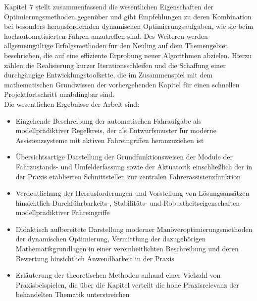Kapitel~7 stellt zusammenfassend die wesentlichen Eigenschaften der Optimierungsmethoden gegenüber und gibt Empfehlungen zu deren Kombination bei besonders herausfordernden dynamischen Optimierungsaufgaben, wie sie beim hochautomatisierten Fahren anzutreffen sind. Des Weiteren werden allgemeingültige Erfolgsmethoden für den Neuling auf dem Themengebiet beschrieben, die auf eine effiziente Erprobung neuer Algorithmen abzielen. Hierzu zählen die Realisierung kurzer Iterationsschleifen und die Schaffung einer durchgängige Entwicklungstoolkette, die im Zusammenspiel mit dem mathematischen Grundwissen der vorhergehenden Kapitel für einen schnellen Projektfortschritt unabdingbar sind. \\

Die wesentlichen Ergebnisse der Arbeit sind:
\begin{itemize}
	\item Eingehende Beschreibung der automatischen Fahraufgabe als modellprädiktiver Regelkreis, der als Entwurfsmuster für moderne Assistenzsysteme mit aktiven Fahreingriffen heranzuziehen ist
	\item Übersichtsartige Darstellung der Grundfunktionsweisen der Module der Fahrzustands- und Umfelderfassung sowie der Aktuatorik einschließlich der in der Praxis etablierten Schnittstellen zur zentralen Fahrerassistenzfunktion
	\item Verdeutlichung der Herausforderungen und Vorstellung von Lösungsansätzen hinsichtlich Durchführbarkeits-, Stabilitäts- und Robustheitseigenschaften modellprädiktiver Fahreingriffe
	\item Didaktisch aufbereitete Darstellung moderner Manöveroptimierungsmethoden der dynamischen Optimierung, Vermittlung der dazugehörigen Mathematikgrundlagen in einer vereinheitlichten Beschreibung und deren Bewertung hinsichtlich Anwendbarkeit in der Praxis
	\item Erläuterung der theoretischen Methoden anhand einer Vielzahl von Praxisbeispielen, die über die Kapitel verteilt die hohe Praxisrelevanz der behandelten Thematik unterstreichen
\end{itemize}


